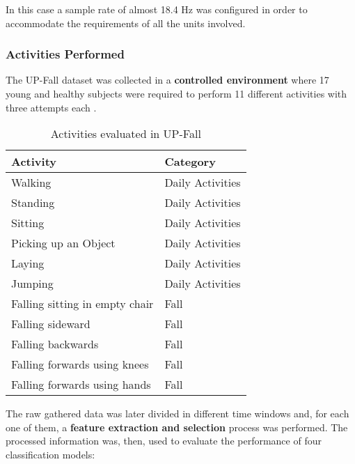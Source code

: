In this case a sample rate of almost 18.4 Hz was configured in order to accommodate the requirements of all the units involved.

\subsubsection{Activities Performed}\label{subsubsec:upfall-activities}

The UP-Fall dataset was collected in a \textbf{controlled environment} where 17 young and healthy subjects were required to perform 11 different activities with three attempts each \cite{upfall}.

\begin{table}[H]
\centering
\begin{tabular}{ll}
    \hline
    Activity                          &   Category           \\
    \hline
    Walking                           &   Daily Activities   \\
    Standing                          &   Daily Activities   \\
    Sitting                           &   Daily Activities   \\
    Picking up an Object              &   Daily Activities   \\
    Laying                            &   Daily Activities   \\
    Jumping                           &   Daily Activities   \\
    Falling sitting in empty chair    &   Fall               \\
    Falling sideward                  &   Fall               \\
    Falling backwards                 &   Fall               \\
    Falling forwards using knees      &   Fall               \\
    Falling forwards using hands      &   Fall               \\
    \hline
\end{tabular}
\caption{Activities evaluated in UP-Fall}
\label{toc:umafall2}
\end{table}

The raw gathered data was later divided in different time windows and, for each one of them, a \textbf{feature extraction and selection} process was performed. The processed information was, then, used to evaluate the performance of four classification models: 

